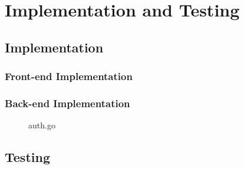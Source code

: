 \chapter{Implementation and Testing}

\section{Implementation}

\subsection{Front-end Implementation}

\subsection{Back-end Implementation}

\begin{figure}[H]
\begin{center}

	\caption{auth.go}
	\label{dia_auth_go}

\end{center}
\end{figure}



\section{Testing}